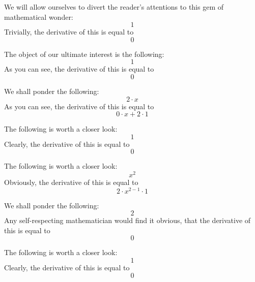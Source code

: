 \documentclass{article}
\begin{document}
We will allow ourselves to divert the reader's attentions to this gem of mathematical wonder:
\begin{equation}
1 
\end{equation}
Trivially, the derivative of this is equal to
\begin{equation}
0 
\end{equation}

The object of our ultimate interest is the following:
\begin{equation}
1 
\end{equation}
As you can see, the derivative of this is equal to
\begin{equation}
0 
\end{equation}

We shall ponder the following:
\begin{equation}
2 \cdot x 
\end{equation}
As you can see, the derivative of this is equal to
\begin{equation}
0 \cdot x + 2 \cdot 1 
\end{equation}

The following is worth a closer look:
\begin{equation}
1 
\end{equation}
Clearly, the derivative of this is equal to
\begin{equation}
0 
\end{equation}

The following is worth a closer look:
\begin{equation}
x ^{2 } 
\end{equation}
Obviously, the derivative of this is equal to
\begin{equation}
2 \cdot x ^{2 - 1 } \cdot 1 
\end{equation}

We shall ponder the following:
\begin{equation}
2 
\end{equation}
Any self-respecting mathematician would find it obvious, that the derivative of this is equal to
\begin{equation}
0 
\end{equation}

The following is worth a closer look:
\begin{equation}
1 
\end{equation}
Clearly, the derivative of this is equal to
\begin{equation}
0 
\end{equation}
\end{document}
